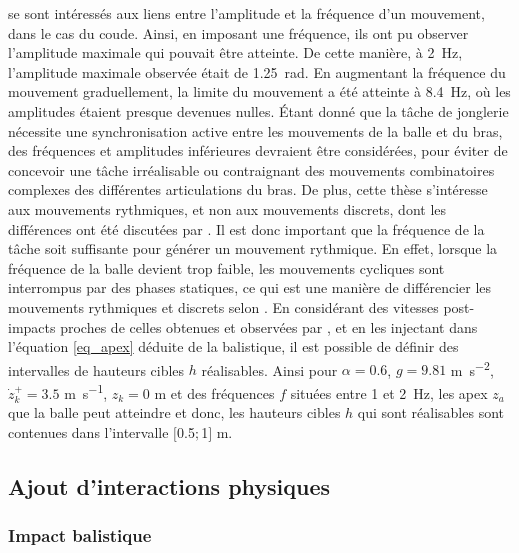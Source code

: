 \documentclass[12pt, a4paper]{article} %
\numberwithin{equation}{section}
\begin{document}
\cite{zawadzki_maximal_2010} se sont intéressés aux liens entre l'amplitude et la fréquence d'un mouvement, dans le cas du coude. Ainsi, en imposant une fréquence, ils ont pu observer l'amplitude maximale qui pouvait être atteinte. De cette manière, à \SI{2}{\hertz}, l'amplitude maximale observée était de \SI{1.25}{\radian}. En augmentant la fréquence du mouvement graduellement, la limite du mouvement a été atteinte à \SI{8.4}{\hertz}, où les amplitudes étaient presque devenues nulles. Étant donné que la tâche de jonglerie nécessite une synchronisation active entre les mouvements de la balle et du bras, des fréquences et amplitudes inférieures devraient être considérées, pour éviter de concevoir une tâche irréalisable ou contraignant des mouvements combinatoires complexes des différentes articulations du bras. De plus, cette thèse s'intéresse aux mouvements rythmiques, et non aux mouvements discrets, dont les différences ont été discutées par \cite{hogan_rhythmic_2007}. Il est donc important que la fréquence de la tâche soit suffisante pour générer un mouvement rythmique. En effet, lorsque la fréquence de la balle devient trop faible, les mouvements cycliques sont interrompus par des phases statiques, ce qui est une manière de différencier les mouvements rythmiques et discrets selon \cite{sternad_transitions_2013}.
%
\newlineBlank
%
En considérant des vitesses post-impacts proches de celles obtenues et observées par \cite{avrin_dynamic_2017}, et en les injectant dans l'équation \cref{eq_apex} déduite de la balistique, il est possible de définir des intervalles de hauteurs cibles $ h $ réalisables. Ainsi pour $\alpha = 0.6$, $g = 9.81$ \si{\metre\per\second\squared}, $\dot{z}_k^+ = 3.5$ \si{\metre\per\second}, $z_k=0$ \si{\metre} et des fréquences $ f $ situées entre \SI{1}{} et \SI{2}{\hertz}, les apex $ z_a $ que la balle peut atteindre et donc, les hauteurs cibles $ h $ qui sont réalisables sont contenues dans l'intervalle $[$\SI{0.5}{}$ ; $\SI{1}{}$]$ \si{\metre}. 


\subsection{Ajout d'interactions physiques}  \label{sec_bouncing_sub_interactions}

\subsubsection{Impact balistique}  \label{sec_bouncing_sub_interactions_sub_bouncing}
\end{document}
